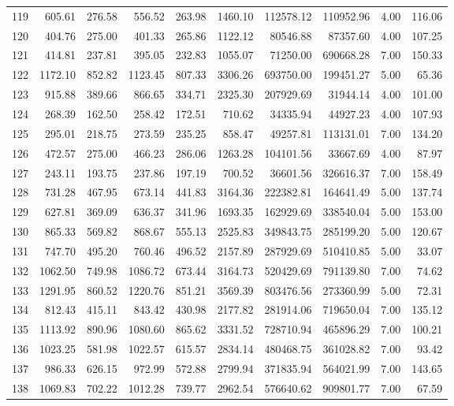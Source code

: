 \begin{tabular}{lrrrrrrrrr}
119 & 605.61 & 276.58 & 556.52 & 263.98 & 1460.10 & 112578.12 & 110952.96 & 4.00 & 116.06 \\
120 & 404.76 & 275.00 & 401.33 & 265.86 & 1122.12 & 80546.88 & 87357.60 & 4.00 & 107.25 \\
121 & 414.81 & 237.81 & 395.05 & 232.83 & 1055.07 & 71250.00 & 690668.28 & 7.00 & 150.33 \\
122 & 1172.10 & 852.82 & 1123.45 & 807.33 & 3306.26 & 693750.00 & 199451.27 & 5.00 & 65.36 \\
123 & 915.88 & 389.66 & 866.65 & 334.71 & 2325.30 & 207929.69 & 31944.14 & 4.00 & 101.00 \\
124 & 268.39 & 162.50 & 258.42 & 172.51 & 710.62 & 34335.94 & 44927.23 & 4.00 & 107.93 \\
125 & 295.01 & 218.75 & 273.59 & 235.25 & 858.47 & 49257.81 & 113131.01 & 7.00 & 134.20 \\
126 & 472.57 & 275.00 & 466.23 & 286.06 & 1263.28 & 104101.56 & 33667.69 & 4.00 & 87.97 \\
127 & 243.11 & 193.75 & 237.86 & 197.19 & 700.52 & 36601.56 & 326616.37 & 7.00 & 158.49 \\
128 & 731.28 & 467.95 & 673.14 & 441.83 & 3164.36 & 222382.81 & 164641.49 & 5.00 & 137.74 \\
129 & 627.81 & 369.09 & 636.37 & 341.96 & 1693.35 & 162929.69 & 338540.04 & 5.00 & 153.00 \\
130 & 865.33 & 569.82 & 868.67 & 555.13 & 2525.83 & 349843.75 & 285199.20 & 5.00 & 120.67 \\
131 & 747.70 & 495.20 & 760.46 & 496.52 & 2157.89 & 287929.69 & 510410.85 & 5.00 & 33.07 \\
132 & 1062.50 & 749.98 & 1086.72 & 673.44 & 3164.73 & 520429.69 & 791139.80 & 7.00 & 74.62 \\
133 & 1291.95 & 860.52 & 1220.76 & 851.21 & 3569.39 & 803476.56 & 273360.99 & 5.00 & 72.31 \\
134 & 812.43 & 415.11 & 843.42 & 430.98 & 2177.82 & 281914.06 & 719650.04 & 7.00 & 135.12 \\
135 & 1113.92 & 890.96 & 1080.60 & 865.62 & 3331.52 & 728710.94 & 465896.29 & 7.00 & 100.21 \\
136 & 1023.25 & 581.98 & 1022.57 & 615.57 & 2834.14 & 480468.75 & 361028.82 & 7.00 & 93.42 \\
137 & 986.33 & 626.15 & 972.99 & 572.88 & 2799.94 & 371835.94 & 564021.99 & 7.00 & 143.65 \\
138 & 1069.83 & 702.22 & 1012.28 & 739.77 & 2962.54 & 576640.62 & 909801.77 & 7.00 & 67.59 \\

\end{tabular}
